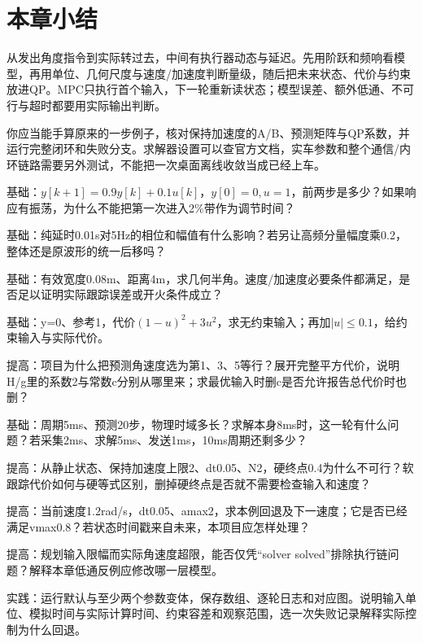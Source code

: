 \section{本章小结}
\begin{conclusion}
从发出角度指令到实际转过去，中间有执行器动态与延迟。先用阶跃和频响看模型，再用单位、几何尺度与速度/加速度判断量级，随后把未来状态、代价与约束放进QP。MPC只执行首个输入，下一轮重新读状态；模型误差、额外低通、不可行与超时都要用实际输出判断。

你应当能手算原来的一步例子，核对保持加速度的A/B、预测矩阵与QP系数，并运行完整闭环和失败分支。求解器设置可以查官方文档，实车参数和整个通信/内环链路需要另外测试，不能把一次桌面离线收敛当成已经上车。
\end{conclusion}

\begin{problemset}
\item\label{prob:v2-mpc-step} 基础：$y[k+1]=0.9y[k]+0.1u[k]$，$y[0]=0,u=1$，前两步是多少？如果响应有振荡，为什么不能把第一次进入2\%带作为调节时间？
\item\label{prob:v2-mpc-delay} 基础：纯延时0.01s对5Hz的相位和幅值有什么影响？若另让高频分量幅度乘0.2，整体还是原波形的统一后移吗？
\item\label{prob:v2-mpc-geometry} 基础：有效宽度0.08m、距离4m，求几何半角。速度/加速度必要条件都满足，是否足以证明实际跟踪误差或开火条件成立？
\item\label{prob:v2-mpc-scalar} 基础：y=0、参考1，代价$(1-u)^2+3u^2$，求无约束输入；再加$|u|\le0.1$，给约束输入与实际代价。
\item\label{prob:v2-mpc-matrix} 提高：项目为什么把预测角速度选为第1、3、5等行？展开完整平方代价，说明H/g里的系数2与常数c分别从哪里来；求最优输入时删c是否允许报告总代价时也删？
\item\label{prob:v2-mpc-time} 基础：周期5ms、预测20步，物理时域多长？求解本身8ms时，这一轮有什么问题？若采集2ms、求解5ms、发送1ms，10ms周期还剩多少？
\item\label{prob:v2-mpc-infeasible} 提高：从静止状态、保持加速度上限2、dt0.05、N2，硬终点0.4为什么不可行？软跟踪代价如何与硬等式区别，删掉硬终点是否就不需要检查输入和速度？
\item\label{prob:v2-mpc-fallback} 提高：当前速度1.2rad/s，dt0.05、amax2，求本例回退及下一速度；它是否已经满足vmax0.8？若状态时间戳来自未来，本项目应怎样处理？
\item\label{prob:v2-mpc-filter} 提高：规划输入限幅而实际角速度超限，能否仅凭“solver solved”排除执行链问题？解释本章低通反例应修改哪一层模型。
\item\label{prob:v2-mpc-experiment} 实践：运行默认与至少两个参数变体，保存数组、逐轮日志和对应图。说明输入单位、模拟时间与实际计算时间、约束容差和观察范围，选一次失败记录解释实际控制为什么回退。
\end{problemset}

